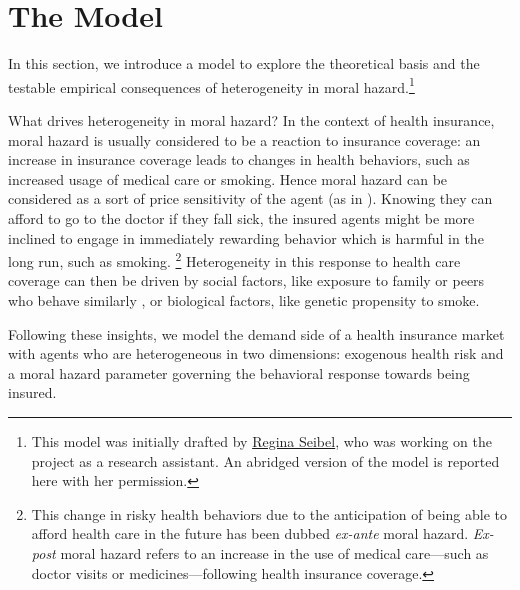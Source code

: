 
\section{The Model}
\label{appsec:model}
In this section, we introduce a model to explore the theoretical basis and the testable empirical consequences of heterogeneity in moral hazard.\footnote{This model was initially drafted by \href{https://www.econ.uzh.ch/en/people/graduatestudents/seibel.html}{Regina Seibel}, who was working on the project as a research assistant. An abridged version of the model is reported here with her permission.}

What drives heterogeneity in moral hazard?
In the context of health insurance, moral hazard is usually considered to be a reaction to insurance coverage: an increase in insurance coverage leads to changes in health behaviors, such as increased usage of medical care \citep{Einav2018} or smoking.
Hence moral hazard can be considered as a sort of price sensitivity of the agent (as in \citealp{Einav2013}).
Knowing they can afford to go to the doctor if they fall sick, the insured agents might be more inclined to engage in immediately rewarding behavior which is harmful in the long run, such as smoking.%
\footnote{This change in risky health behaviors due to the anticipation of being able to afford health care in the future has been dubbed \textit{ex-ante} moral hazard.
\textit{Ex-post} moral hazard refers to an increase in the use of medical care---such as doctor visits or medicines---following health insurance coverage.}
Heterogeneity in this response to health care coverage can then be driven by social factors, like exposure to family or peers who behave similarly \citep{Chatterjee2018,Hoffmann2017}, or biological factors, like genetic propensity to smoke.

Following these insights, we model the demand side of a health insurance market with agents who are heterogeneous in two dimensions: exogenous health risk and a moral hazard parameter governing the behavioral response towards being insured.

